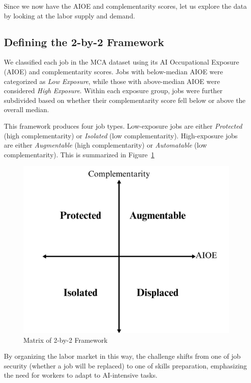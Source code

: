 Since we now have the AIOE and complementarity scores, let us explore the data by looking at the labor supply and demand.

\subsection{Defining the 2-by-2 Framework}
We classified each job in the MCA dataset using its AI Occupational Exposure (AIOE) 
and complementarity scores. Jobs with below-median AIOE were categorized as 
\textit{Low Exposure}, while those with above-median AIOE were considered 
\textit{High Exposure}. Within each exposure group, jobs were further subdivided 
based on whether their complementarity score fell below or above the overall median. 

This framework produces four job types. Low-exposure jobs are either 
\textit{Protected} (high complementarity) or \textit{Isolated} (low complementarity). 
High-exposure jobs are either \textit{Augmentable} (high complementarity) or 
\textit{Automatable} (low complementarity). This is summarized in Figure~\ref{fig:framework}

\begin{figure}[ht] 
    \centering 
    \includegraphics[width=\linewidth]{../figures/framework.jpg} 
    \caption{Matrix of 2-by-2 Framework}
    \label{fig:framework} 
\end{figure}

By organizing the labor market in this way, the challenge shifts from one of job security (whether a job will be replaced) to one of 
skills preparation, emphasizing the need for workers to adapt to AI-intensive tasks.


